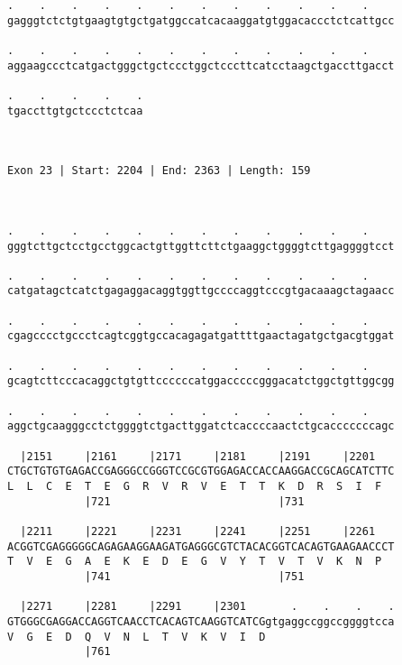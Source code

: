 \documentclass{article}
\begin{document}
\begin{Verbatim}
.    .    .    .    .    .    .    .    .    .    .    .    
gagggtctctgtgaagtgtgctgatggccatcacaaggatgtggacaccctctcattgcc
                                                            
.    .    .    .    .    .    .    .    .    .    .    .    
aggaagccctcatgactgggctgctccctggctcccttcatcctaagctgaccttgacct
                                                            
.    .    .    .    .
tgaccttgtgctccctctcaa
                     
                     
 
Exon 23 | Start: 2204 | End: 2363 | Length: 159



.    .    .    .    .    .    .    .    .    .    .    .    
gggtcttgctcctgcctggcactgttggttcttctgaaggctggggtcttgaggggtcct
                                                            
.    .    .    .    .    .    .    .    .    .    .    .    
catgatagctcatctgagaggacaggtggttgccccaggtcccgtgacaaagctagaacc
                                                            
.    .    .    .    .    .    .    .    .    .    .    .    
cgagcccctgccctcagtcggtgccacagagatgattttgaactagatgctgacgtggat
                                                            
.    .    .    .    .    .    .    .    .    .    .    .    
gcagtcttcccacaggctgtgttccccccatggacccccgggacatctggctgttggcgg
                                                            
.    .    .    .    .    .    .    .    .    .    .    .    
aggctgcaagggcctctggggtctgacttggatctcaccccaactctgcacccccccagc
                                                            
  |2151     |2161     |2171     |2181     |2191     |2201   
CTGCTGTGTGAGACCGAGGGCCGGGTCCGCGTGGAGACCACCAAGGACCGCAGCATCTTC
L  L  C  E  T  E  G  R  V  R  V  E  T  T  K  D  R  S  I  F  
            |721                          |731              
  
  |2211     |2221     |2231     |2241     |2251     |2261   
ACGGTCGAGGGGGCAGAGAAGGAAGATGAGGGCGTCTACACGGTCACAGTGAAGAACCCT
T  V  E  G  A  E  K  E  D  E  G  V  Y  T  V  T  V  K  N  P  
            |741                          |751              
  
  |2271     |2281     |2291     |2301       .    .    .    .
GTGGGCGAGGACCAGGTCAACCTCACAGTCAAGGTCATCGgtgaggccggccggggtcca
V  G  E  D  Q  V  N  L  T  V  K  V  I  D                    
            |761                                            
  

\end{Verbatim}
\end{document}
